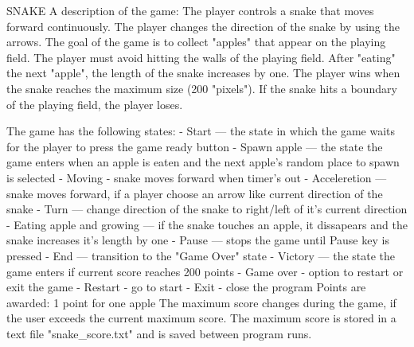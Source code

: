 \documentclass[a4paper]{article}
\begin{document}
SNAKE\newline
\newline
A description of the game:\newline
The player controls a snake that moves forward continuously.
The player changes the direction of the snake by using the arrows. The goal of the game is to collect "apples" that appear on the playing field.
The player must avoid hitting the walls of the playing field. After "eating" the next "apple", the length of the snake increases by one.
The player wins when the snake reaches the maximum size (200 "pixels"). If the snake hits a boundary of the playing field, the player loses.\newline

The game has the following states:\newline
- Start — the state in which the game waits for the player to press the game ready button\newline
- Spawn apple — the state the game enters when an apple is eaten and the next apple's random place to spawn is selected\newline
- Moving - snake moves forward when timer's out\newline
- Acceleretion — snake moves forward, if a player choose an arrow like current direction of the snake\newline
- Turn — change direction of the snake to right/left of it's current direction\newline
- Eating apple and growing — if the snake touches an apple, it dissapears and the snake increases it's length by one\newline
- Pause — stops the game until Pause key is pressed\newline
- End — transition to the "Game Over" state\newline
- Victory — the state the game enters if current score reaches 200 points\newline
- Game over - option to restart or exit the game\newline
- Restart - go to start\newline
- Exit - close the program\newline
\newline
Points are awarded: 1 point for one apple\newline
The maximum score changes during the game,
if the user exceeds the current maximum score.
The maximum score is stored in a text file "snake\_score.txt" and is saved between program runs. 
\end{document}
